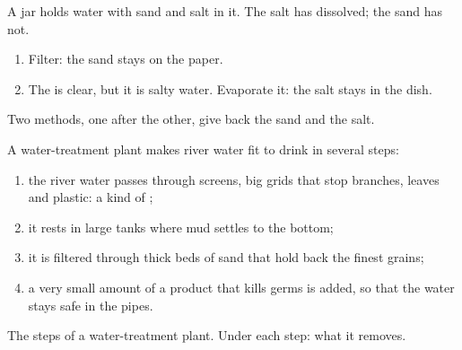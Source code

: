 \begin{example}\label{ex:g3:separating-mixtures:three}
A jar holds water with sand and salt in it. The salt has dissolved; the
sand has not.
\begin{enumerate}
  \item Filter: the sand stays on the paper.
  \item The  is clear, but it is salty water. Evaporate it: the
        salt stays in the dish.
\end{enumerate}
Two methods, one after the other, give back the sand and the salt.
\end{example}

\begin{example}\label{ex:g3:separating-mixtures:plant}
A water-treatment plant makes river water fit to drink in several steps:
\begin{enumerate}
  \item the river water passes through screens, big grids that stop
        branches, leaves and plastic: a kind of ;
  \item it rests in large tanks where mud settles to the bottom;
  \item it is filtered through thick beds of sand that hold back the
        finest grains;
  \item a very small amount of a product that kills germs is added, so
        that the water stays safe in the pipes.
\end{enumerate}
\end{example}

\begin{omfigure}

{\small The steps of a water-treatment plant. Under each step: what it
removes.}
\end{omfigure}


